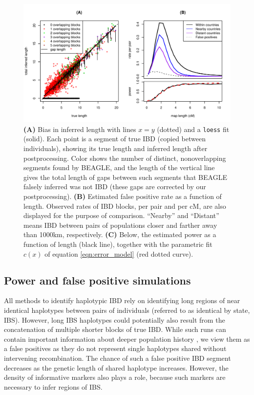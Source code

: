 \documentclass{article}
\begin{document}
\begin{figure}[!htp]
  \begin{center}
    \includegraphics{power-and-fp}
    \caption{
    {\bf (A)} Bias in inferred length with lines $x=y$ (dotted) and a {\tt loess} fit (solid).
      Each point is a segment of true IBD (copied between individuals),
      showing its true length and inferred length after postprocessing.
      Color shows the number of distinct, nonoverlapping segments found by BEAGLE,
      and the length of the vertical line gives the total length of gaps between such segments
      that BEAGLE falsely inferred was not IBD (these gaps are corrected by our postprocessing).
    {\bf (B)}  Estimated false positive rate as a function of length.
Observed rates of IBD blocks, per pair and per cM, are also displayed for the purpose of comparison.
    ``Nearby'' and ``Distant'' means IBD between pairs of populations closer and farther away than 1000km, respectively.
    {\bf (C)} Below, the estimated power as a function of length (black line), together with the parametric fit $c(x)$ of equation \eqref{eqn:error_model} (red dotted curve).
      \label{fig:power_and_fp}
    }
  \end{center}
\end{figure}

\subsection{Power and false positive simulations}
\label{ss:error_model}

All methods to identify haplotypic IBD rely on identifying long regions of near identical haplotypes 
between pairs of individuals (referred to as identical by state, IBS).  
However, long IBS haplotypes could potentially also result from the concatenation
of multiple shorter blocks of true IBD. 
While such runs can contain important information about deeper population history
\citep[e.g.][]{li2011inference, harris2012inferring}, 
we view them as a false positives as they do not represent single haplotypes shared without intervening recombination. 
The chance of such a false positive IBD segment decreases as the genetic length of shared haplotype increases. 
However, the density of informative markers also plays a role,
because such markers are necessary to infer regions of IBS.
\end{document}
